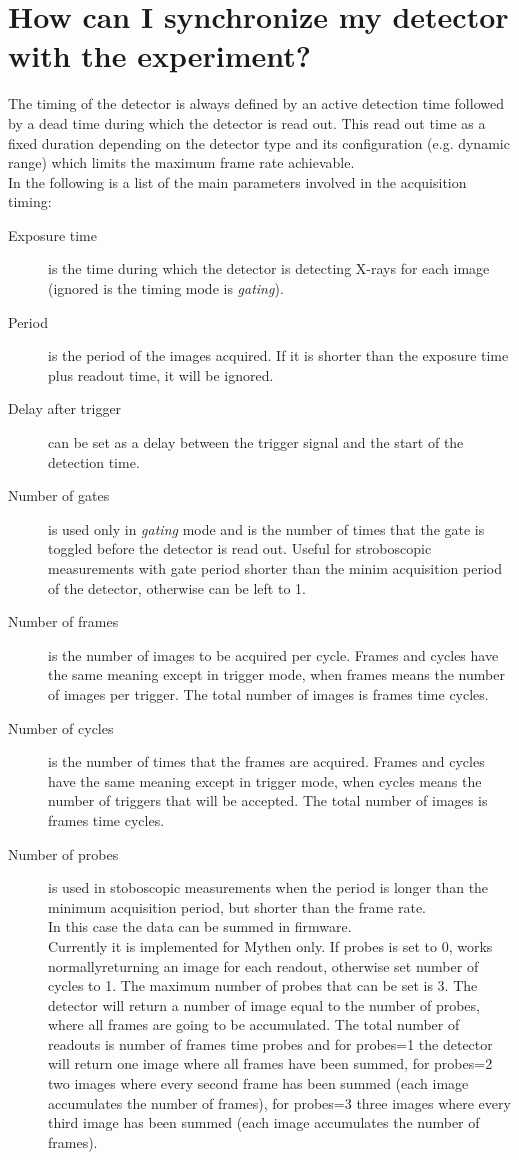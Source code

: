 \section{How can I synchronize my detector with the experiment?}\label{sec:timing}

The timing of the detector is always defined by an active detection time followed by a dead time during which the detector is read out. This read out time as a fixed duration depending on the detector type and its configuration (e.g. dynamic range) which limits the maximum frame rate achievable.\\
In the following is a list of the main parameters involved in the acquisition timing:
\begin{description}
\item[Exposure time] is the time during which the detector is detecting X-rays for each image (ignored is the timing mode is \textit{gating}).
\item[Period] is the period of the images acquired. If it is shorter than the exposure time plus readout time, it will be ignored.
\item[Delay after trigger] can be set as a delay between the trigger signal and the start of the detection time. 
\item[Number of gates] is used only in \textit{gating} mode and is the number of times that the gate is toggled before the detector is read out. Useful for stroboscopic measurements with gate period shorter than the minim acquisition period of the detector, otherwise can be left to 1.
\item[Number of frames] is the number of images to be acquired per cycle. Frames and cycles have the same meaning except in trigger mode, when frames means the number of images per trigger. The total number of images is frames time cycles.
\item[Number of cycles] is the number of times that the frames are acquired. Frames and cycles have the same meaning except in trigger mode, when cycles means the number of triggers that will be accepted. The total number of images is frames time cycles.
\item[Number of probes] is used in stoboscopic measurements when the period is longer than the minimum acquisition period, but shorter than the frame rate.\\
In this case the data can be summed in firmware. \\
Currently it is implemented for Mythen only. If probes is set to 0, works normallyreturning an image for each readout, otherwise set number of cycles to 1. The maximum number of probes that can be set is 3. The detector will return a number of image equal to the number of probes, where all frames are going to be accumulated. The total number of readouts is number of frames time probes and for  probes=1 the detector will return one image where all frames have been summed, for  probes=2 two images where every second frame has been summed (each image accumulates the number of frames), for probes=3 three images where every third image has been summed (each image accumulates the number of frames).\\

\end{description}
